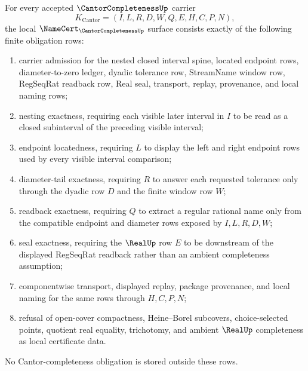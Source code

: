 \begin{theorem}
\label{thm:cantor-completeness-namecert-obligations}
For every accepted $\CantorCompletenessUp$ carrier
$$
K_{\mathrm{Cantor}}=(I,L,R,D,W,Q,E,H,C,P,N),
$$
the local $\NameCert_{\CantorCompletenessUp}$ surface consists exactly of the following finite obligation rows:
\begin{enumerate}
\item carrier admission for the nested closed interval spine, located endpoint rows, diameter-to-zero ledger, dyadic tolerance row, StreamName window row, RegSeqRat readback row, Real seal, transport, replay, provenance, and local naming rows;
\item nesting exactness, requiring each visible later interval in $I$ to be read as a closed subinterval of the preceding visible interval;
\item endpoint locatedness, requiring $L$ to display the left and right endpoint rows used by every visible interval comparison;
\item diameter-tail exactness, requiring $R$ to answer each requested tolerance only through the dyadic row $D$ and the finite window row $W$;
\item readback exactness, requiring $Q$ to extract a regular rational name only from the compatible endpoint and diameter rows exposed by $I,L,R,D,W$;
\item seal exactness, requiring the $\RealUp$ row $E$ to be downstream of the displayed RegSeqRat readback rather than an ambient completeness assumption;
\item componentwise transport, displayed replay, package provenance, and local naming for the same rows through $H,C,P,N$;
\item refusal of open-cover compactness, Heine--Borel subcovers, choice-selected points, quotient real equality, trichotomy, and ambient $\RealUp$ completeness as local certificate data.
\end{enumerate}
No Cantor-completeness obligation is stored outside these rows.
\end{theorem}
